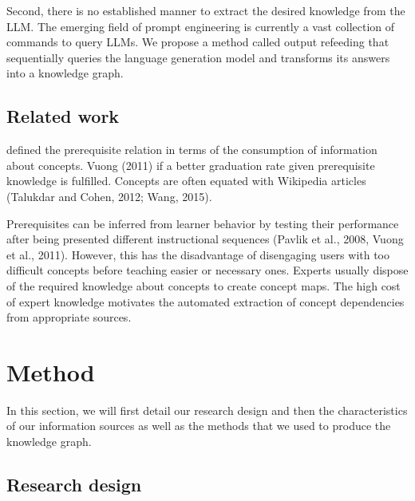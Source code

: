 \documentclass{article}
\begin{document}
Second, there is no established manner to extract the desired knowledge from the LLM. The emerging field of prompt engineering is currently a vast collection of commands to query LLMs. We propose a method called output refeeding that sequentially queries the language generation model and transforms its answers into a knowledge graph.

\subsection{Related work}
\cite{talukdar2012crowdsourced} defined the prerequisite relation in terms of the consumption of information about concepts. Vuong (2011) if a better graduation rate given prerequisite knowledge is fulfilled. Concepts are often equated with Wikipedia articles (Talukdar and Cohen, 2012; Wang, 2015).

Prerequisites can be inferred from learner behavior by testing their performance after being presented different instructional sequences (Pavlik et al., 2008, Vuong et al., 2011). However, this has the disadvantage of disengaging users with too difficult concepts before teaching easier or necessary ones. Experts usually dispose of the required knowledge about concepts to create concept maps. The high cost of expert knowledge motivates the automated extraction of concept dependencies from appropriate sources.



\section{Method}
In this section, we will first detail our research design and then the characteristics of our information sources as well as the methods that we used to produce the knowledge graph. 

\subsection{Research design} 
\end{document}
